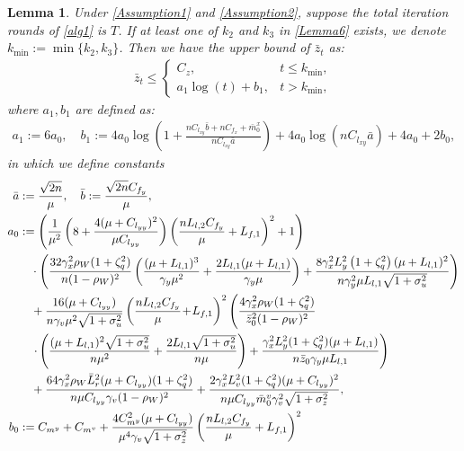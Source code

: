 \documentclass{article}
\theoremstyle{plain}
\newtheorem{lemma}[lemma]{Lemma}
\theoremstyle{definition}
\theoremstyle{remark}
\begin{document}
\begin{lemma}\label{Lemma10} Under \cref{Assumption1} and \cref{Assumption2}, suppose the total iteration rounds of \cref{alg1} is $T$. If at least one of $k_2$ and $k_3$ in \cref{Lemma6} exists, we denote $k_{\text{min}} := \min\{k_2, k_3\}$. Then we have the upper bound of $\bar{z}_t$ as:
\begin{align}
\bar{z}_t \leq
\begin{cases}
C_z, & t \leq k_{\text{min}}, \\
a_1 \log(t) + b_1, & t > k_{\text{min}},
\end{cases}\label{eq83}
\end{align}
where $a_1, b_1$ are defined as:
\begin{align}
a_1:= 6a_0,\quad b_1:= 4a_0 \log \left( 1 + \frac{nC_{l_{xy}} \bar{b} + nC_{f_x} + \bar{m}^x_0}{nC_{l_{xy}} \bar{a}} \right) + 4a_0\log \left( nC_{l_{xy}} \bar{a}\right) + 4a_0 + 2b_0,\label{eq84}
\end{align}
in which we define constants
\begin{align}
\bar{a} &:= \frac{\sqrt{2n}}{\mu}, \quad
\bar{b} := \frac{\sqrt{2n}C_{f_y}}{\mu}, \notag\\
a_0 &:= \left( \frac{1}{\mu^2}\left(8+\frac{4(\mu + C_{l_{yy}})^2}{\mu C_{l_{yy}}} \right)\left(\frac{nL_{l,2}C_{f_y}}{\mu}+L_{f,1}\right)^2+1\right) \notag \\
&\quad \cdot\left(\frac{32 \gamma_x^2 \rho_W(1 + \zeta_q^2)}{n(1 - \rho_W)^2} \left(\frac{(\mu+L_{l,1})^3}{\gamma_y\mu^2}+\frac{2L_{l,1}(\mu+L_{l,1})}{\gamma_y\mu}\right)+\frac{8\gamma_x^2  L_y^2\left( 1 + \zeta_q^2 \right) (\mu + L_{l,1})^2}{n\gamma_y^2\mu L_{l,1}\sqrt{1+\sigma_u^2}}\right)\nonumber\\
&\quad +\frac{16(\mu + C_{l_{yy}})}{n\gamma_v\mu^2\sqrt{1+\sigma_u^2}}\left(\frac{nL_{l,2}C_{f_y}}{\mu}\!+\!L_{f,1}\right)^2\left(\frac{4 \gamma_x^2 \rho_W (1 + \zeta_q^2)}{\bar{z}_0^2(1 - \rho_W)^2} \right.\nonumber\\
&\quad \left.\cdot\left(\frac{(\mu+L_{l,1})^2\sqrt{1+\sigma_u^2}}{n\mu^2 }+\frac{2L_{l,1}\sqrt{1+\sigma_u^2}}{n\mu }\right)+\frac{\gamma_x^2L_y^2(1+\zeta_q^2)(\mu + L_{l,1})}{n\bar{z}_0\gamma_y \mu L_{l,1}}\right)\nonumber\\
&\quad+ \frac{64 \gamma_x^2 \rho_W \bar{L}_r^2(\mu + C_{l_{yy}})(1 + \zeta_q^2)}{n\mu C_{l_{yy}}\gamma_v(1 - \rho_W)^2} + \frac{2\gamma_x^2L_v^2(1+\zeta_q^2)(\mu + C_{l_{yy}})^2}{n\mu C_{l_{yy}}\bar{m}_0^v\gamma_v^2\sqrt{1+\sigma_z^2}}, \notag\\
b_0 &:=C_{m^y} + C_{m^v} +\frac{4C_{m^y}^2(\mu + C_{l_{yy}})}{\mu^4\gamma_v\sqrt{1+\sigma_z^2}}\left(\frac{nL_{l,2}C_{f_y}}{\mu}+L_{f,1}\right)^2 \nonumber\\

\end{align}
\end{lemma}
\end{document}
